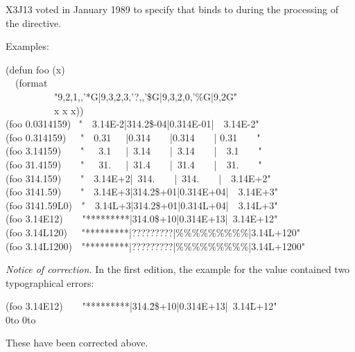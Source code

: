 \begin{flushdesc}
\begin{new}
X3J13 voted in January 1989
to specify that  binds  to 
during the processing of the  directive.
\end{new}
\begin{obsolete}
Examples:
\begin{lisp}
(defun foo (x) \\
~~(format {\nil} \\
~~~~~~~~~~"{\Xtilde}9,2,1,,'*G|{\Xtilde}9,3,2,3,'?,,'\$G|{\Xtilde}9,3,2,0,'\%G|{\Xtilde}9,2G" \\
~~~~~~~~~~x x x)) \\[10pt]
(foo 0.0314159) \EV\ "~~3.14E-2|314.2\$-04|0.314E-01|~~3.14E-2" \\
(foo 0.314159)~~\EV\ "~~0.31~~~|0.314~~~~|0.314~~~~| 0.31~~~~" \\
(foo 3.14159)~~~\EV\ "~~~3.1~~~|~3.14~~~~|~3.14~~~~|~~3.1~~~~" \\
(foo 31.4159)~~~\EV\ "~~~31.~~~|~31.4~~~~|~31.4~~~~|~~31.~~~~" \\
(foo 314.159)~~~\EV\ "~~3.14E+2|~314.~~~~|~314.~~~~|~~3.14E+2" \\
(foo 3141.59)~~~\EV\ "~~3.14E+3|314.2\$+01|0.314E+04|~~3.14E+3" \\
(foo 3141.59L0)~\EV\ "~~3.14L+3|314.2\$+01|0.314L+04|~~3.14L+3" \\
(foo 3.14E12)~~~\EV\ "*********|314.0\$+10|0.314E+13|~3.14E+12" \\
(foo 3.14L120)~~\EV\ "*********|?????????|\%\%\%\%\%\%\%\%\%|3.14L+120" \\
(foo 3.14L1200)~\EV\ "*********|?????????|\%\%\%\%\%\%\%\%\%|3.14L+1200"
\end{lisp}
\end{obsolete}
\newpage%
\begin{new}%
\emph{Notice of correction.}
In the first edition, the example for the value  contained two
typographical errors:
\begin{lisp}
(foo 3.14E12)~~~\EV\ "*********|314.\=2\$+10|0.314E+13|~3.14\=L+12" \\
\>\hbox{0}\hbox to \>\hbox{0}\hbox to  \\
\end{lisp}
These have been corrected above.
\end{new}


\end{flushdesc}
